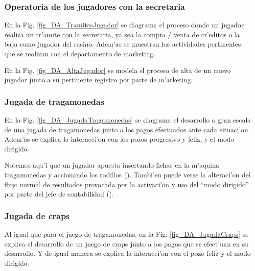 \subsubsection{Operatoria de los jugadores con la secretaria}
En la Fig. \ref{fig_DA_TramitesJugador} se diagrama el proceso donde un jugador realiza un tr'amite con la secretaria, ya sea la compra / venta de cr'editos o la baja como jugador del casino. Adem'as se muestran las actividades pertinentes que se realizan con el departamento de marketing. 


\clearpage

En la Fig. \ref{fig_DA_AltaJugador} se modela el proceso de alta de un nuevo jugador junto a su pertinente registro por parte de m'arketing.



\clearpage




\subsubsection{Jugada de tragamonedas}
En la Fig. \ref{fig_DA_JugadaTragamonedas} se diagrama el desarrollo a gran escala de una jugada de tragamonedas junto a los pagos efectuados ante cada situaci'on. Adem'as se explica la interacci'on con los pozos progresivo y feliz, y el modo dirigido.


Notemos aqu'i que un jugador apuesta insertando fichas en la m'aquina tragamonedas y accionando los rodillos ().
Tambi'en puede verse la alteraci'on del flujo normal de resultados provocada por la activaci'on y uso del ``modo dirigido'' por parte del jefe de contabilidad ().

\clearpage





\subsubsection{Jugada de craps}
Al igual que para el juego de tragamonedas, en la Fig. \ref{fig_DA_JugadaCraps} se explica el desarrollo de un juego de craps junto a los pagos que se efect'uan en su desarrollo. Y de igual manera se explica la interacci'on con el pozo feliz y el modo dirigido.

